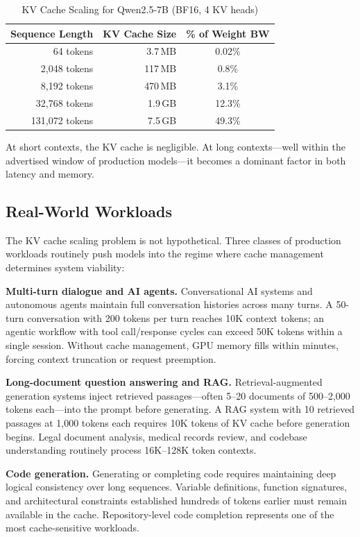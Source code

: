 \documentclass[conference]{IEEEtran}
\begin{document}
\begin{table}[h]
\centering
\caption{KV Cache Scaling for Qwen2.5-7B (BF16, 4 KV heads)}
\label{tab:kv_scaling}
\begin{tabular}{@{}rrc@{}}
\toprule
\textbf{Sequence Length} & \textbf{KV Cache Size} & \textbf{\% of Weight BW} \\
\midrule
64 tokens & 3.7\,MB & 0.02\% \\
2,048 tokens & 117\,MB & 0.8\% \\
8,192 tokens & 470\,MB & 3.1\% \\
32,768 tokens & 1.9\,GB & 12.3\% \\
131,072 tokens & 7.5\,GB & 49.3\% \\
\bottomrule
\end{tabular}
\end{table}

At short contexts, the KV cache is negligible. At long contexts---well within the advertised window of production models---it becomes a dominant factor in both latency and memory.

\subsection{Real-World Workloads}

The KV cache scaling problem is not hypothetical. Three classes of production workloads routinely push models into the regime where cache management determines system viability:

\textbf{Multi-turn dialogue and AI agents.} Conversational AI systems and autonomous agents maintain full conversation histories across many turns. A 50-turn conversation with 200 tokens per turn reaches 10K context tokens; an agentic workflow with tool call/response cycles can exceed 50K tokens within a single session. Without cache management, GPU memory fills within minutes, forcing context truncation or request preemption.

\textbf{Long-document question answering and RAG.} Retrieval-augmented generation systems inject retrieved passages---often 5--20 documents of 500--2,000 tokens each---into the prompt before generating. A RAG system with 10 retrieved passages at 1,000 tokens each requires 10K tokens of KV cache before generation begins. Legal document analysis, medical records review, and codebase understanding routinely process 16K--128K token contexts.

\textbf{Code generation.} Generating or completing code requires maintaining deep logical consistency over long sequences. Variable definitions, function signatures, and architectural constraints established hundreds of tokens earlier must remain available in the cache. Repository-level code completion represents one of the most cache-sensitive workloads.
\end{document}
